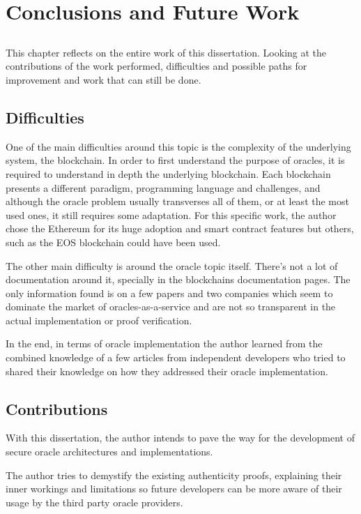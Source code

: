 \chapter{Conclusions and Future Work} \label{chap:concl}

\section*{}

This chapter reflects on the entire work of this dissertation. Looking at the contributions of the work performed, difficulties and possible paths for improvement and work that can still be done.

\section{Difficulties}
One of the main difficulties around this topic is the complexity of the underlying system, the blockchain. In order to first understand the purpose of oracles, it is required to understand in depth the underlying blockchain. Each blockchain presents a different paradigm, programming language and challenges, and although the oracle problem usually transverses all of them, or at least the most used ones, it still requires some adaptation. For this specific work, the author chose the Ethereum for its huge adoption and smart contract features but others, such as the EOS blockchain could have been used.

The other main difficulty is around the oracle topic itself. There's not a lot of documentation around it, specially in the blockchains documentation pages. The only information found is on a few papers and two companies which seem to dominate the market of oracles-as-a-service and are not so transparent in the actual implementation or proof verification.

In the end, in terms of oracle implementation the author learned from the combined knowledge of a few articles from independent developers who tried to shared their knowledge on how they addressed their oracle implementation.

\section{Contributions}
With this dissertation, the author intends to pave the way for the development of secure oracle architectures and implementations.

The author tries to demystify the existing authenticity proofs, explaining their inner workings and limitations so future developers can be more aware of their usage by the third party oracle providers.

